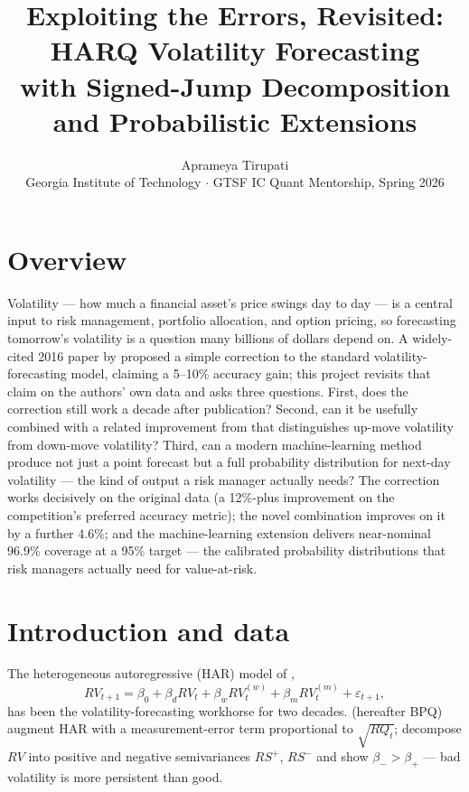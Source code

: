 \documentclass[10pt,letterpaper]{article}
\title{\vspace{-2.5em}Exploiting the Errors, Revisited: HARQ Volatility Forecasting\\[-0.15em] with Signed-Jump Decomposition and Probabilistic Extensions}
\author{Aprameya Tirupati\\\small Georgia Institute of Technology $\cdot$ GTSF IC Quant Mentorship, Spring 2026}
\date{\vspace{-1em}}
\begin{document}
\maketitle
\vspace{-3.5em}

\section*{Overview}
Volatility --- how much a financial asset's price swings day to day --- is a central input to risk management, portfolio allocation, and option pricing, so forecasting tomorrow's volatility is a question many billions of dollars depend on. A widely-cited 2016 paper by \citet{bpq2016} proposed a simple correction to the standard volatility-forecasting model, claiming a 5--10\% accuracy gain; this project revisits that claim on the authors' own data and asks three questions. First, does the correction still work a decade after publication? Second, can it be usefully combined with a related improvement from \citet{pattonsheppard2015} that distinguishes up-move volatility from down-move volatility? Third, can a modern machine-learning method produce not just a point forecast but a full probability distribution for next-day volatility --- the kind of output a risk manager actually needs? The correction works decisively on the original data (a 12\%-plus improvement on the competition's preferred accuracy metric); the novel combination improves on it by a further 4.6\%; and the machine-learning extension delivers near-nominal 96.9\% coverage at a 95\% target --- the calibrated probability distributions that risk managers actually need for value-at-risk.

\section{Introduction and data}
The heterogeneous autoregressive (HAR) model of \citet{corsi2009},
\begin{equation}
RV_{t+1} = \beta_0 + \beta_d RV_t + \beta_w RV_t^{(w)} + \beta_m RV_t^{(m)} + \varepsilon_{t+1},
\end{equation}
has been the volatility-forecasting workhorse for two decades. \citet{bpq2016} (hereafter BPQ) augment HAR with a measurement-error term proportional to $\sqrt{RQ_t}$; \citet{pattonsheppard2015} decompose $RV$ into positive and negative semivariances $RS^+$, $RS^-$ \citep[following][]{bns2010} and show $\beta_- > \beta_+$ --- bad volatility is more persistent than good.
\end{document}
